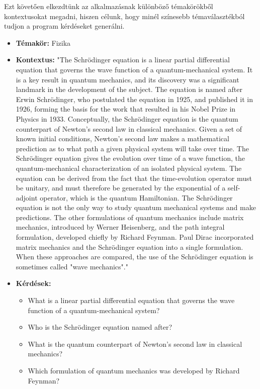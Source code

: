 Ezt követően elkezdtünk az alkalmazásnak különböző témakörökből kontextusokat megadni, hiszen célunk, hogy minél színesebb témaválasztékból tudjon a program kérdéseket generálni.

\begin{itemize}
\item \textbf{Témakör:} Fizika
\item \textbf{Kontextus:} "The Schrödinger equation is a linear partial differential equation that governs the wave function of a quantum-mechanical system. It is a key result in quantum mechanics, and its discovery was a significant landmark in the development of the subject. The equation is named after Erwin Schrödinger, who postulated the equation in 1925, and published it in 1926, forming the basis for the work that resulted in his Nobel Prize in Physics in 1933.
Conceptually, the Schrödinger equation is the quantum counterpart of Newton's second law in classical mechanics. Given a set of known initial conditions, Newton's second law makes a mathematical prediction as to what path a given physical system will take over time. The Schrödinger equation gives the evolution over time of a wave function, the quantum-mechanical characterization of an isolated physical system. The equation can be derived from the fact that the time-evolution operator must be unitary, and must therefore be generated by the exponential of a self-adjoint operator, which is the quantum Hamiltonian.
The Schrödinger equation is not the only way to study quantum mechanical systems and make predictions. The other formulations of quantum mechanics include matrix mechanics, introduced by Werner Heisenberg, and the path integral formulation, developed chiefly by Richard Feynman. Paul Dirac incorporated matrix mechanics and the Schrödinger equation into a single formulation. When these approaches are compared, the use of the Schrödinger equation is sometimes called "wave mechanics"."
\item \textbf{Kérdések:} 
	\begin{itemize}
		\item What is a linear partial differential equation that governs the wave function of a quantum-mechanical system?
		\item Who is the Schrödinger equation named after?
		\item What is the quantum counterpart of Newton's second law in classical mechanics?
		\item Which formulation of quantum mechanics was developed by Richard Feynman?
	\end{itemize}
	

\end{itemize}

